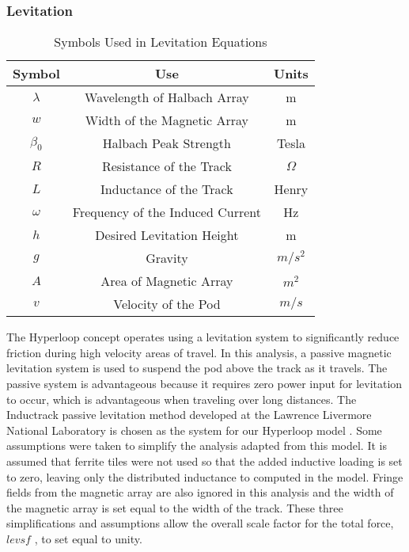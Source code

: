 \subsubsection{Levitation}
	\begin{table}[ht]
	\caption{Symbols Used in Levitation Equations} 
	\centering 
	\begin{tabular}{c c c} 
	\hline\hline 
	Symbol & Use & Units\\ [0.5ex] 
	\hline 
	$\lambda$ & Wavelength of Halbach Array & m\\
	$w$ & Width of the Magnetic Array & m\\
	$\beta _{0}$ & Halbach Peak Strength & Tesla\\
	$R$ & Resistance of the Track & $\Omega$\\
	$L$ & Inductance of the Track & Henry\\
	$\omega$ & Frequency of the Induced Current & Hz\\
	$h$ & Desired Levitation Height & m\\
	$g$ & Gravity & $m/s^{2}$\\
	$A$ & Area of Magnetic Array & $m^{2}$\\
	$v$ & Velocity of the Pod & $m/s$\\ [1ex] 
	\hline 
	\end{tabular}
	\label{table:nonlin} 
	\end{table}
	The Hyperloop concept operates using a levitation system to significantly reduce friction during high velocity areas of travel. In this analysis, a passive magnetic levitation system is used to suspend the pod above the track as it travels. The passive system is advantageous because it requires zero power input for levitation to occur, which is advantageous when traveling over long distances. The Inductrack passive levitation method developed at the Lawrence Livermore National Laboratory is chosen as the system for our Hyperloop model \cite{inductrack}. Some assumptions were taken to simplify the analysis adapted from this model. It is assumed that ferrite tiles were not used so that the added inductive loading is set to zero, leaving only the distributed inductance to computed in the model. Fringe fields from the magnetic array are also ignored in this analysis and the width of the magnetic array is set equal to the width of the track. These three simplifications and assumptions allow the overall scale factor for the total force, $levsf$ , to set equal to unity.

